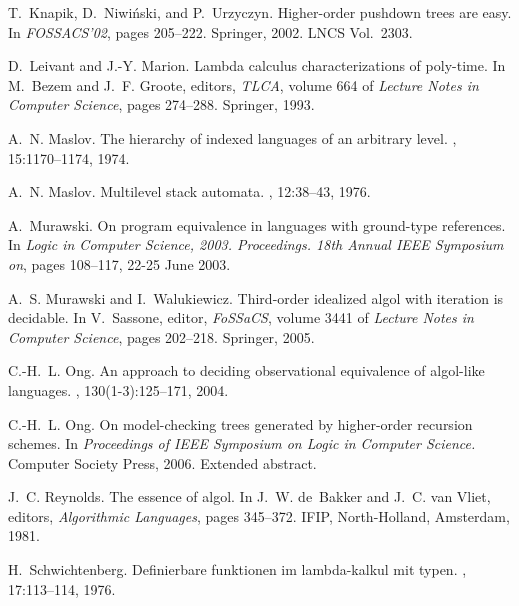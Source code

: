 \documentclass{llncs}
\begin{document}
\begin{thebibliography}{10}
T.~Knapik, D.~Niwi{\'n}ski, and P.~Urzyczyn.
\newblock Higher-order pushdown trees are easy.
\newblock In {\em FOSSACS'02}, pages 205--222. Springer, 2002.
\newblock LNCS Vol.~2303.

D.~Leivant and J.-Y. Marion.
\newblock Lambda calculus characterizations of poly-time.
\newblock In M.~Bezem and J.~F. Groote, editors, {\em TLCA}, volume 664 of {\em
  Lecture Notes in Computer Science}, pages 274--288. Springer, 1993.

A.~N. Maslov.
\newblock The hierarchy of indexed languages of an arbitrary level.
, 15:1170--1174, 1974.

A.~N. Maslov.
\newblock Multilevel stack automata.
, 12:38--43, 1976.

A.~Murawski.
\newblock On program equivalence in languages with ground-type references.
\newblock In {\em Logic in Computer Science, 2003. Proceedings. 18th Annual
  IEEE Symposium on}, pages 108--117, 22-25 June 2003.

A.~S. Murawski and I.~Walukiewicz.
\newblock Third-order idealized algol with iteration is decidable.
\newblock In V.~Sassone, editor, {\em FoSSaCS}, volume 3441 of {\em Lecture
  Notes in Computer Science}, pages 202--218. Springer, 2005.

C.-H.~L. Ong.
\newblock An approach to deciding observational equivalence of algol-like
  languages.
, 130(1-3):125--171, 2004.

C.-H.~L. Ong.
\newblock On model-checking trees generated by higher-order recursion schemes.
\newblock In {\em Proceedings of IEEE Symposium on Logic in Computer Science.}
  Computer Society Press, 2006.
\newblock Extended abstract.

J.~C. Reynolds.
\newblock The essence of algol.
\newblock In J.~W. de~Bakker and J.~C. van Vliet, editors, {\em Algorithmic
  Languages}, pages 345--372. IFIP, North-Holland, Amsterdam, 1981.

H.~Schwichtenberg.
\newblock Definierbare funktionen im lambda-kalkul mit typen.
, 17:113--114, 1976.

\end{thebibliography}
\end{document}
